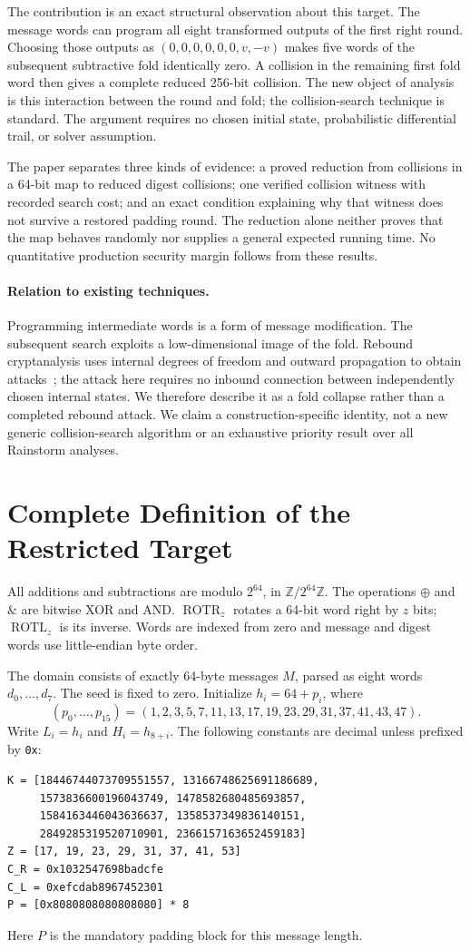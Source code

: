 \documentclass[10pt]{article}
\theoremstyle{definition}
\newcommand{\W}{\mathbb{Z}/2^{64}\mathbb{Z}}
\newcommand{\ROTR}{\operatorname{ROTR}}
\newcommand{\ROTL}{\operatorname{ROTL}}
\newcommand{\code}[1]{\texttt{#1}}
\begin{document}
The contribution is an exact structural observation about this target. The message words can program all eight transformed outputs of the first right round. Choosing those outputs as $(0,0,0,0,0,0,v,-v)$ makes five words of the subsequent subtractive fold identically zero. A collision in the remaining first fold word then gives a complete reduced 256-bit collision. The new object of analysis is this interaction between the round and fold; the collision-search technique is standard. The argument requires no chosen initial state, probabilistic differential trail, or solver assumption.

The paper separates three kinds of evidence: a proved reduction from collisions in a 64-bit map to reduced digest collisions; one verified collision witness with recorded search cost; and an exact condition explaining why that witness does not survive a restored padding round. The reduction alone neither proves that the map behaves randomly nor supplies a general expected running time. No quantitative production security margin follows from these results.

\paragraph{Relation to existing techniques.}
Programming intermediate words is a form of message modification. The subsequent search exploits a low-dimensional image of the fold. Rebound cryptanalysis uses internal degrees of freedom and outward propagation to obtain attacks~\cite{lamberger2010}; the attack here requires no inbound connection between independently chosen internal states. We therefore describe it as a fold collapse rather than a completed rebound attack. We claim a construction-specific identity, not a new generic collision-search algorithm or an exhaustive priority result over all Rainstorm analyses.

\section{Complete Definition of the Restricted Target}
\label{sec:scope}
All additions and subtractions are modulo $2^{64}$, in $\W$. The operations $\oplus$ and $\mathbin{\&}$ are bitwise XOR and AND. $\ROTR_z$ rotates a 64-bit word right by $z$ bits; $\ROTL_z$ is its inverse. Words are indexed from zero and message and digest words use little-endian byte order.

The domain consists of exactly 64-byte messages $M$, parsed as eight words $d_0,\ldots,d_7$. The seed is fixed to zero. Initialize $h_i=64+p_i$, where
\[
(p_0,\ldots,p_{15})=(1,2,3,5,7,11,13,17,19,23,29,31,37,41,43,47).
\]
Write $L_i=h_i$ and $H_i=h_{8+i}$. The following constants are decimal unless prefixed by \code{0x}:
\begin{lstlisting}[style=code]
K = [18446744073709551557, 13166748625691186689,
     1573836600196043749, 1478582680485693857,
     1584163446043636637, 1358537349836140151,
     2849285319520710901, 2366157163652459183]
Z = [17, 19, 23, 29, 31, 37, 41, 53]
C_R = 0x1032547698badcfe
C_L = 0xefcdab8967452301
P = [0x8080808080808080] * 8
\end{lstlisting}
Here $P$ is the mandatory padding block for this message length.
\end{document}
